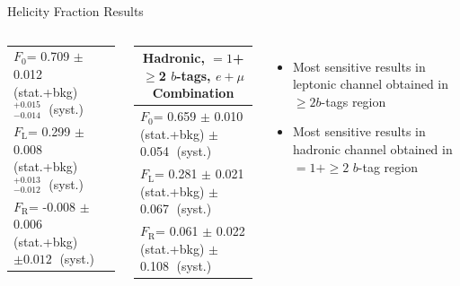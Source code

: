 \documentclass{beamer}
\newcommand*{\fo}{\ensuremath{F_{\text{0}}}\xspace}
\newcommand*{\fl}{\ensuremath{F_{\text{L}}}\xspace}
\newcommand*{\fr}{\ensuremath{F_{\text{R}}}\xspace}
\newcommand*{\syst}{\mbox{$\;$(syst.)}\xspace}
\begin{document}
{\begin{frame}{Helicity Fraction Results}
{\begin{columns}
\begin{center}
\begin{tabular}{l}
            \fo = 0.709 $\pm$ 0.012 (stat.+bkg) ${}^{+0.015}_{-0.014}$ \syst     \\[5pt]
            \fl = 0.299 $\pm$ 0.008 (stat.+bkg) ${}^{+0.013}_{-0.012}$ \syst    \\[5pt]
            \fr = -0.008 $\pm$ 0.006 (stat.+bkg) $\pm 0.012$ \syst    \\[5pt]
            \hline
          \end{tabular}
        \end{center}
        \begin{center}\fontsize{8}{9}\selectfont
          \begin{tabular}{l}
            \hline
            \multicolumn{1}{c}{Hadronic, $=1$+$\geq$2 $b$-tags, $e+\mu$ Combination}\\
            \hline
            \fo = 0.659 $\pm$ 0.010 (stat.+bkg) $\pm$ 0.054 \syst     \\
            \fl = 0.281 $\pm$ 0.021 (stat.+bkg) $\pm$ 0.067 \syst    \\
            \fr = 0.061 $\pm$ 0.022 (stat.+bkg) $\pm$ 0.108 \syst   \\ 
            \hline
          \end{tabular}
        \end{center}
        \begin{itemize}
          \item Most sensitive results in leptonic channel obtained in $\geq 2 b$-tags region
          \item Most sensitive results in hadronic channel obtained in $=1 + \geq2$ $b$-tag region
        \end{itemize}
      \end{columns}
    
    }
  \end{frame}

}
\end{document}
